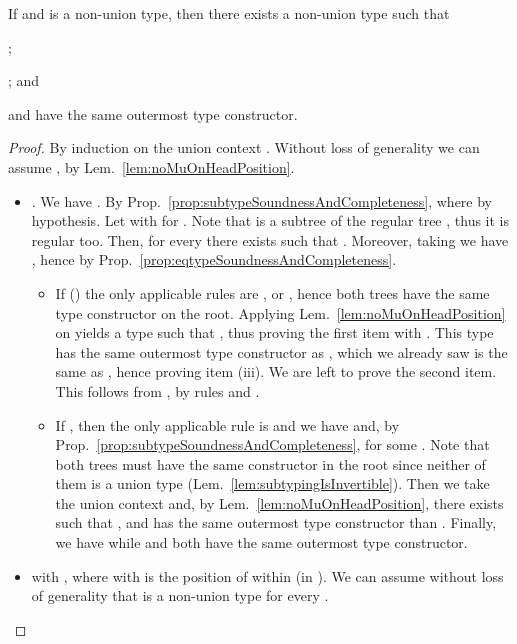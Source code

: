 \begin{lemma}\label{lem:supertypesOfNonUnionTypes}
If  and  is a non-union type, then there exists a
non-union type  such that
\begin{inparaenum}[(i)]
  \item ;
  \item ; and
  \item  and  have the same outermost type constructor.
\end{inparaenum}
\end{lemma}



\begin{proof}
By induction on the union context . Without loss of generality we can
assume , by Lem.~\ref{lem:noMuOnHeadPosition}.
\begin{itemize}
  \item . We have . By
  Prop.~\ref{prop:subtypeSoundnessAndCompleteness},  where  by hypothesis. Let
   with  for . Note that  is a subtree of the regular
  tree , thus it is regular too. Then, for every 
  there exists  such that . Moreover,
  taking  we have , hence  by
  Prop.~\ref{prop:eqtypeSoundnessAndCompleteness}.
  \begin{itemize}
    \item If  (\ie ) the only
    applicable rules are ,  or
    , hence both trees have the same type constructor on the
    root. Applying Lem.~\ref{lem:noMuOnHeadPosition} on  yields a type 
    such that , thus proving the first item with .
    This type  has the same outermost type constructor as , which we
    already saw is the same as , hence proving item (iii). We are left to
    prove the second item. This follows from , 
    by rules  and .
    
    \item If , then the only applicable rule is  and we
    have  and,
    by Prop.~\ref{prop:subtypeSoundnessAndCompleteness},  for
    some . Note that both trees must have the same constructor in
    the root since neither of them is a union type
    (Lem.~\ref{lem:subtypingIsInvertible}).
    Then we take the union context 
    and, by Lem.~\ref{lem:noMuOnHeadPosition}, there exists  such
    that ,  and has the same
    outermost type constructor than . Finally, we have  while  and both have the same outermost
    type constructor.
  \end{itemize}

  \item 
  with , where  with  is the position of  within 
  (\ie  in ). We can assume without loss of generality that 
  is a non-union type for every .
  

\end{itemize}
\end{proof}
